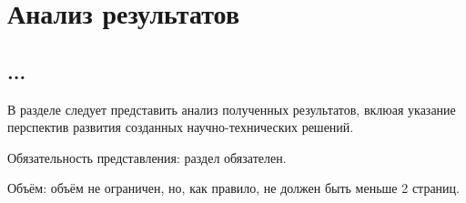 \chapter{Анализ результатов}\label{chap6_results_analysis}
\section{...}

В разделе следует представить анализ полученных результатов, вклюая указание перспектив развития созданных научно-технических решений.

Обязательность представления: раздел обязателен.

Объём: объём не ограничен, но, как правило, не должен быть меньше 2 страниц.




